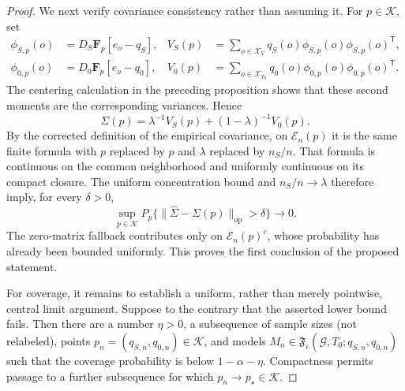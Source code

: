 \documentclass{article}
\begin{document}
\begin{proof}
We next verify covariance consistency rather than assuming it.  For \(p\in\mathcal K\), set
\[
\begin{aligned}
\phi_{S,p}(o)&=D_S\mathbf F_p[e_o-q_S],
&V_S(p)&=\sum_{o\in\mathcal X_V}q_S(o)\phi_{S,p}(o)\phi_{S,p}(o)^{\mathsf T},\\
\phi_{0,p}(o)&=D_0\mathbf F_p[e_o-q_0],
&V_0(p)&=\sum_{o\in\mathcal X_{T_0}}q_0(o)\phi_{0,p}(o)\phi_{0,p}(o)^{\mathsf T}.
\end{aligned}
\]
The centering calculation in the preceding proposition shows that these second moments are the corresponding variances.  Hence
\[
\Sigma(p)=\lambda^{-1}V_S(p)+(1-\lambda)^{-1}V_0(p).
\]
By the corrected definition of the empirical covariance, on \(\mathcal E_n(p)\) it is the same finite formula with \(p\) replaced by \(\widehat p\) and \(\lambda\) replaced by \(n_S/n\).  That formula is continuous on the common neighborhood and uniformly continuous on its compact closure.  The uniform concentration bound and \(n_S/n\to\lambda\) therefore imply, for every \(\delta>0\),
\[
\sup_{p\in\mathcal K}P_p\{\|\widehat\Sigma-\Sigma(p)\|_{\mathrm{op}}>\delta\}\longrightarrow0.
\]
The zero-matrix fallback contributes only on \(\mathcal E_n(p)^c\), whose probability has already been bounded uniformly.  This proves the first conclusion of the proposed statement.

For coverage, it remains to establish a uniform, rather than merely pointwise, central limit argument.  Suppose to the contrary that the asserted lower bound fails.  Then there are a number \(\eta>0\), a subsequence of sample sizes (not relabeled), points \(p_n=(q_{S,n},q_{0,n})\in\mathcal K\), and models \(M_n\in\mathfrak F_{\epsilon}(\mathcal G,T_0;q_{S,n},q_{0,n})\) such that the coverage probability is below \(1-\alpha-\eta\).  Compactness permits passage to a further subsequence for which \(p_n\to p_\star\in\mathcal K\).


\end{proof}
\end{document}
